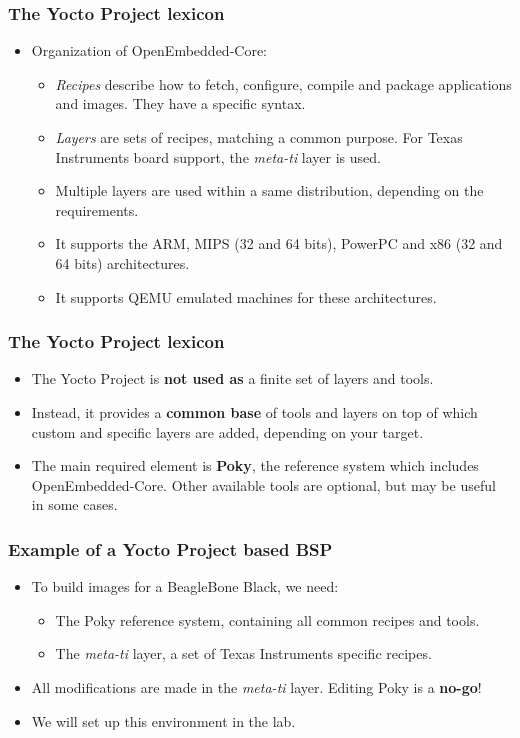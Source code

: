 \begin{frame}
  \frametitle{The Yocto Project lexicon}
  \begin{itemize}
    \item Organization of OpenEmbedded-Core:
    \begin{itemize}
      \item {\em Recipes} describe how to fetch, configure, compile
        and package applications and images. They have a specific
        syntax.
      \item {\em Layers} are sets of recipes, matching a common
        purpose. For Texas Instruments board support, the {\em
        meta-ti} layer is used.
      \item Multiple layers are used within a same distribution,
        depending on the requirements.
      \item It supports the ARM, MIPS (32 and 64 bits), PowerPC and
        x86 (32 and 64 bits) architectures.
      \item It supports QEMU emulated machines for these architectures.
    \end{itemize}
  \end{itemize}
\end{frame}

\begin{frame}
  \frametitle{The Yocto Project lexicon}
  \begin{itemize}
    \item The Yocto Project is \textbf{not used as} a finite set of
          layers and tools.
    \item Instead, it provides a \textbf{common base} of tools and
          layers on top of which custom and specific layers are added,
          depending on your target.
    \item The main required element is \textbf{Poky}, the reference
          system which includes OpenEmbedded-Core. Other available
          tools are optional, but may be useful in some cases.
  \end{itemize}
\end{frame}

\begin{frame}
  \frametitle{Example of a Yocto Project based BSP}
  \begin{itemize}
    \item To build images for a BeagleBone Black, we need:
    \begin{itemize}
      \item The Poky reference system, containing all common recipes
            and tools.
      \item The {\em meta-ti} layer, a set of Texas Instruments
            specific recipes.
    \end{itemize}
    \item All modifications are made in the {\em meta-ti} layer.
      Editing Poky is a \textbf{no-go}!
    \item We will set up this environment in the lab.
  \end{itemize}
\end{frame}

